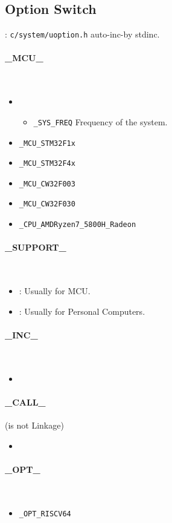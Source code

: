 \subsection{Option Switch}

: \verb`c/system/uoption.h` auto-inc-by stdinc.

\paragraph{\_MCU\_} \
\begin{itemize}
	\item {}\begin{itemize}
		\item \verb`_SYS_FREQ` Frequency of the system.
	\end{itemize}
	\item \verb`_MCU_STM32F1x`
	\item \verb`_MCU_STM32F4x`
	\item \verb`_MCU_CW32F003`
	\item \verb`_MCU_CW32F030`
	\item \verb`_CPU_AMDRyzen7_5800H_Radeon`
\end{itemize}

\paragraph{\_SUPPORT\_} \
\begin{itemize}
	\item {}: Usually for MCU.
	\item {}: Usually for Personal Computers.
\end{itemize}

\paragraph{\_INC\_} \
\begin{itemize}
	\item%
\end{itemize}

\paragraph{\_CALL\_} (is not Linkage) \
\begin{itemize}
	\item%
\end{itemize}

\paragraph{\_OPT\_} \
\begin{itemize}
	\item \verb`_OPT_RISCV64`
\end{itemize}

